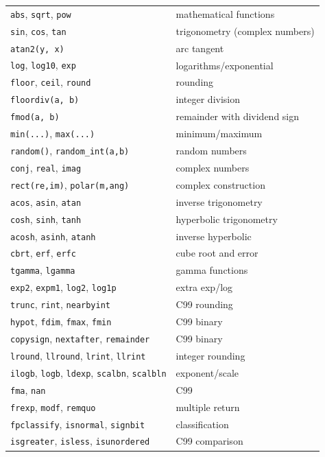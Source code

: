 \documentclass[11pt,a4paper,oneside]{report}
\newcommand{\code}[1]{\texttt{#1}}
\begin{document}
\begin{longtable}{@{}L{4.8cm}L{10.5cm}@{}}
\midrule
\code{abs}, \code{sqrt}, \code{pow} & mathematical functions \\
\code{sin}, \code{cos}, \code{tan} & trigonometry (complex numbers) \\
\code{atan2(y, x)} & arc tangent \\
\code{log}, \code{log10}, \code{exp} & logarithms/exponential \\
\code{floor}, \code{ceil}, \code{round} & rounding \\
\code{floordiv(a, b)} & integer division \\
\code{fmod(a, b)} & remainder with dividend sign \\
\code{min(...)}, \code{max(...)} & minimum/maximum \\
\code{random()}, \code{random\_int(a,b)} & random numbers \\
\code{conj}, \code{real}, \code{imag} & complex numbers \\
\code{rect(re,im)}, \code{polar(m,ang)} & complex construction \\
\code{acos}, \code{asin}, \code{atan} & inverse trigonometry \\
\code{cosh}, \code{sinh}, \code{tanh} & hyperbolic trigonometry \\
\code{acosh}, \code{asinh}, \code{atanh} & inverse hyperbolic \\
\code{cbrt}, \code{erf}, \code{erfc} & cube root and error \\
\code{tgamma}, \code{lgamma} & gamma functions \\
\code{exp2}, \code{expm1}, \code{log2}, \code{log1p} & extra exp/log \\
\code{trunc}, \code{rint}, \code{nearbyint} & C99 rounding \\
\code{hypot}, \code{fdim}, \code{fmax}, \code{fmin} & C99 binary \\
\code{copysign}, \code{nextafter}, \code{remainder} & C99 binary \\
\code{lround}, \code{llround}, \code{lrint}, \code{llrint} & integer rounding \\
\code{ilogb}, \code{logb}, \code{ldexp}, \code{scalbn}, \code{scalbln} & exponent/scale \\
\code{fma}, \code{nan} & C99 \\
\code{frexp}, \code{modf}, \code{remquo} & multiple return \\
\code{fpclassify}, \code{isnormal}, \code{signbit} & classification \\
\code{isgreater}, \code{isless}, \code{isunordered} & C99 comparison \\

\end{longtable}
\end{document}
